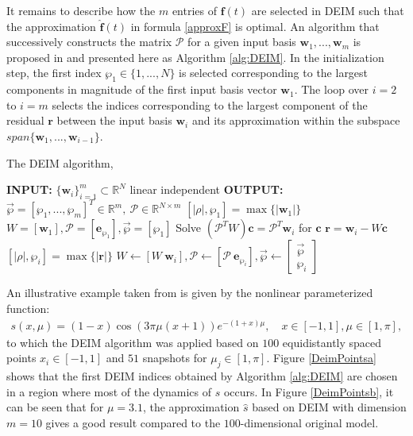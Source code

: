 It remains to describe how the $m$ entries of $\mathbf{f}(t)$ are selected in DEIM such that the approximation $\mathbf{\hat f}(t)$ in formula \eqref{approxF} is optimal. An algorithm that successively constructs the matrix $\mathcal{P}$ for a given input basis $\mathbf{w}_1,...,\mathbf{w}_m$ is proposed in \cite[Section 3.1]{DEIM} and presented here as Algorithm \ref{alg:DEIM}. In the initialization step, the first index $\wp_1 \in \{1,...,N\}$ is selected corresponding to the largest components in magnitude of the first input basis vector $\mathbf{w}_1$. The loop over $i=2$ to $i=m$ selects the indices corresponding to the largest component of the residual $\mathbf{r}$ between the input basis $\mathbf{w}_i$ and its approximation within the subspace $span \{\mathbf{w}_1,...,\mathbf{w}_{i-1}\}$.
\begin{algorithm}[H]
\caption{The DEIM algorithm, \cite{DEIM}}
\label{alg:DEIM}
\begin{algorithmic}[1]
\STATE \textbf{INPUT: } $\{\mathbf{w}_i\}_{i=1}^m \subset \mathbb{R}^N$  linear independent
\STATE \textbf{OUTPUT: } $\vec \wp = [\wp_1,...,\wp_m]^T \in \mathbb{R}^m, \ \mathcal{P} \in \mathbb{R}^{N \times m}$
\STATE $[|\rho|,\wp_1] = \max \{|\mathbf{w}_1|\}$
\STATE $W = [\mathbf{w}_1], \mathcal{P} = [\mathbf{e}_{\wp_1}], \vec \wp = [\wp_1]$
\STATE Solve $(\mathcal{P}^T W) \mathbf{c} = \mathcal{P}^T \mathbf{w}_i$ for $\mathbf{c}$
\STATE $\mathbf{r} = \mathbf{w}_i - W \mathbf{c}$
\STATE $[|\rho|,\wp_i] = \max \{|\mathbf{r}|\}$
\STATE $W \leftarrow [W \ \mathbf{w}_i], \mathcal{P} \leftarrow [\mathcal{P} \ \mathbf{e}_{\wp_i}], \vec \wp \leftarrow \begin{bmatrix} \vec \wp \\ \wp_i \end{bmatrix}$
\ENDFOR
\end{algorithmic}
\end{algorithm}
An illustrative example taken from \cite{DEIM} is given by the nonlinear parameterized function:
\begin{align}
\label{1Dex}
s(x,\mu) = (1-x) \cos(3 \pi \mu (x+1)) e^{-(1+x)\mu}, \quad x \in [-1,1], \mu \in [1,\pi],
\end{align}
to which the DEIM algorithm was applied based on $100$ equidistantly spaced points $x_i \in [-1,1]$ and $51$ snapshots for $\mu_j \in [1,\pi]$. Figure \ref{DeimPointsa} shows that the first DEIM indices obtained by Algorithm \ref{alg:DEIM} are chosen in a region where most of the dynamics of $s$ occurs. In Figure \ref{DeimPointsb}, it can be seen that for $\mu = 3.1$, the approximation $\hat s$ based on DEIM with dimension $m=10$ gives a good result compared to the $100$-dimensional original model.
